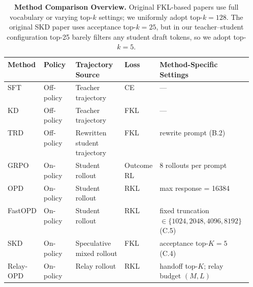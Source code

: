 \begin{table}[H]
\centering
\caption{\textbf{Method Comparison Overview.} Original FKL-based papers use full vocabulary or varying top-$k$ settings; we uniformly adopt top-$k{=}128$. The original SKD paper uses acceptance top-$k{=}25$, but in our teacher--student configuration top-25 barely filters any student draft tokens, so we adopt top-$k{=}5$.}
\label{tab:method-comparison}
\begingroup
\small
\renewcommand{\arraystretch}{1.1}
\setlength{\tabcolsep}{3pt}
\renewcommand{\tabularxcolumn}[1]{m{#1}}
\begin{tabularx}{\linewidth}{>{\raggedright\arraybackslash}m{0.14\linewidth}>{\centering\arraybackslash}m{0.13\linewidth}>{\raggedright\arraybackslash}m{0.20\linewidth}>{\centering\arraybackslash}m{0.09\linewidth}L}
\toprule
\textbf{Method} & \textbf{Policy} & \textbf{Trajectory Source} & \textbf{Loss} & \textbf{Method-Specific Settings} \\
\midrule
SFT & Off-policy & Teacher trajectory & CE & — \\
KD & Off-policy & Teacher trajectory & FKL & — \\
TRD & Off-policy & Rewritten student trajectory & FKL & rewrite prompt (B.2) \\
GRPO & On-policy & Student rollout & Outcome RL & 8 rollouts per prompt \\
OPD & On-policy & Student rollout & RKL & max response = 16384 \\
FastOPD & On-policy & Student rollout & RKL & fixed truncation $\in\{1024,2048,4096,8192\}$ (C.5) \\
SKD & On-policy & Speculative mixed rollout & FKL & acceptance top-$K{=}5$ (C.4) \\
Relay-OPD & On-policy & Relay rollout & RKL & handoff top-$K$; relay budget $(M,L)$ \\
\bottomrule
\end{tabularx}
\endgroup
\end{table}
